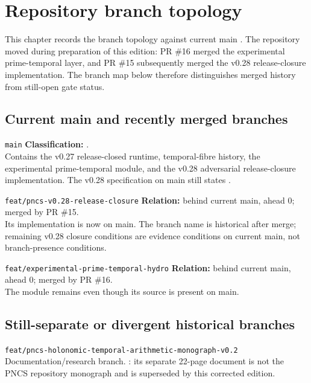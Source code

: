 \chapter{Repository branch topology}

This chapter records the branch topology against current main . The repository moved during preparation of this edition: PR \#16 merged the experimental prime-temporal layer, and PR \#15 subsequently merged the v0.28 release-closure implementation. The branch map below therefore distinguishes merged history from still-open gate status.

\section{Current main and recently merged branches}
\begin{statusbox}{\texttt{main}}
\textbf{Classification:} .\\
Contains the v0.27 release-closed runtime, temporal-fibre history, the experimental prime-temporal module, and the v0.28 adversarial release-closure implementation. The v0.28 specification on main still states .
\end{statusbox}

\begin{statusbox}{\texttt{feat/pncs-v0.28-release-closure}}
\textbf{Relation:} behind current main, ahead 0; merged by PR \#15.\\
Its implementation is now on main. The branch name is historical after merge; remaining v0.28 closure conditions are evidence conditions on current main, not branch-presence conditions.
\end{statusbox}

\begin{statusbox}{\texttt{feat/experimental-prime-temporal-hydro}}
\textbf{Relation:} behind current main, ahead 0; merged by PR \#16.\\
The module remains  even though its source is present on main.
\end{statusbox}

\section{Still-separate or divergent historical branches}
\begin{statusbox}{\texttt{feat/pncs-holonomic-temporal-arithmetic-monograph-v0.2}}
Documentation/research branch. : its separate 22-page document is not the PNCS repository monograph and is superseded by this corrected edition.
\end{statusbox}

